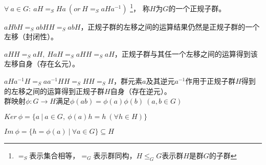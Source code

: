 $\forall\ a\in G:\ aH=_{S}Ha\ (or\ H=_{S}aHa^{-1})$
\footnote{$=_{S}$表示集合相等，$=_{G}$表示群同构，$H \leq_{G} G$表示群$H$是群$G$的子群}，
称$H$为$G$的一个正规子群。

$aHbH=_{S}abHH=_{S}abH$，正规子群的左移之间的运算结果仍然是正规子群的一个左移（封闭性）。

$aHH=_{S}aH,\ HaH=_{S}aHH=_{S}aH$，正规子群与其任一个左移之间的运算得到该左移自身（存在幺元）。

$aHa^{-1}H=_{S}aa^{-1}HH=_{S}HH=_{S}H$，群元素$a$及其逆元$a^{-1}$作用于正规子群$H$得到的左移之间的运算得到正规子群$H$自身（存在逆元）。
\\

群映射$\phi:G\rightarrow H$满足$\phi(ab)=\phi(a)\phi(b)\ (a,b\in G)$

$Ker\ \phi=\{a\ |\ a\in G,\ \phi(a)h=h\ (\forall h\in H)\}$

$Im\ \phi=\{h=\phi(a)\ |\ \forall a\in G\}\subseteq H$


